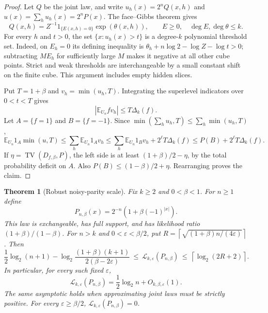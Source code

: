 \documentclass{article}
\newcommand{\LC}{\mathcal{L}}
\newcommand{\E}{\mathbb{E}}
\newtheorem{theorem}{Theorem}
\begin{document}
\begin{proof}
Let $Q$ be the joint law, and write
$u_h(x)=2^nQ(x,h)$ and $u(x)=\sum_hu_h(x)=2^nP(x)$.
The face--Gibbs theorem gives
\[
 Q(x,h)=Z^{-1}1_{\{E(x,h)=0\}}\exp(\theta(x,h)),
 \qquad E\ge0,\quad \deg E,\deg\theta\le k.
\]
For every $h$ and $t>0$, the set $\{x:u_h(x)>t\}$ is a degree-$k$
polynomial threshold set.  Indeed, on $E_h=0$ its defining inequality is
$\theta_h+n\log2-\log Z-\log t>0$; subtracting $M E_h$ for sufficiently
large $M$ makes it negative at all other cube points.  Strict and weak
thresholds are interchangeable by a small constant shift on the finite cube.
This argument includes empty hidden slices.

Put $T=1+\beta$ and $v_h=\min(u_h,T)$.  Integrating the superlevel indicators
over $0<t<T$ gives
\[
 \left|\E_{U_n} f v_h\right|\le T\Delta_k(f).
\]
Let $A=\{f=1\}$ and $B=\{f=-1\}$.  Since
$\min(\sum_hu_h,T)\le\sum_h\min(u_h,T)$,
\[
 \E_{U_n}1_A\min(u,T)
 \le \sum_h\E_{U_n}1_Av_h
 \le \sum_h\E_{U_n}1_Bv_h+2^\ell T\Delta_k(f)
 \le P(B)+2^\ell T\Delta_k(f).
\]
If $\eta=\operatorname{TV}(D_{f,\beta},P)$, the left side is at least
$(1+\beta)/2-\eta$, by the total probability deficit on $A$.
Also $P(B)\le(1-\beta)/2+\eta$.
Rearranging proves the claim.
\end{proof}

\begin{theorem}[Robust noisy-parity scale]
\label{thm:robust-noisy-parity}
Fix $k\ge2$ and $0<\beta<1$.  For $n\ge1$ define
\[
 P_{n,\beta}(x)=2^{-n}(1+\beta(-1)^{|x|}).
\]
This law is exchangeable, has full support, and has likelihood ratio
$(1+\beta)/(1-\beta)$.  For $n>k$ and $0<\varepsilon<\beta/2$, put
$R=\left\lceil\sqrt{(1+\beta)n/(4\varepsilon)}\right\rceil$.
Then
\[
 \frac12\log_2(n+1)
 -\log_2\frac{(1+\beta)(k+1)}{2(\beta-2\varepsilon)}
 \ \le\ \LC_{k,\varepsilon}(P_{n,\beta})
 \ \le\ \left\lceil\log_2(2R+2)\right\rceil.
\]
In particular, for every such fixed $\varepsilon$,
\[
 \LC_{k,\varepsilon}(P_{n,\beta})
 =\frac12\log_2 n+O_{k,\beta,\varepsilon}(1).
\]
The same asymptotic holds when approximating joint laws must be strictly
positive.
For every $\varepsilon\ge\beta/2$,
$\LC_{k,\varepsilon}(P_{n,\beta})=0$.
\end{theorem}
\end{document}
